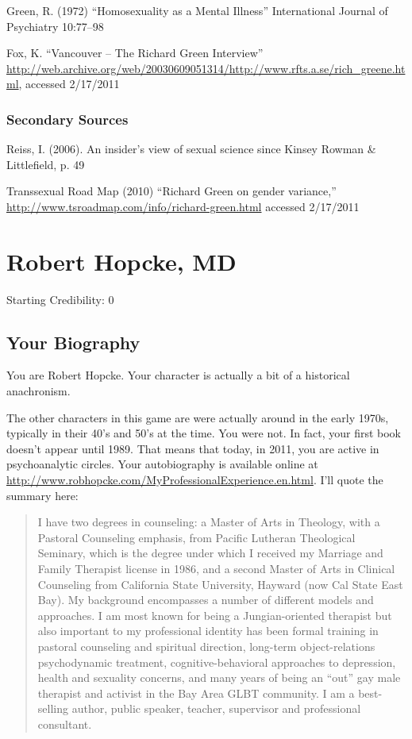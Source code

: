 \begin{refsection}
Green, R. (1972) “Homosexuality as a Mental Illness” International Journal of Psychiatry 10:77--98

Fox, K. “Vancouver – The Richard Green Interview” \url{http://web.archive.org/web/20030609051314/http://www.rfts.a.se/rich_greene.html}, accessed 2\slash 17\slash 2011

\subsection{Secondary Sources}
\label{secondarysources}

Reiss, I. (2006). An insider's view of sexual science since Kinsey Rowman \& Littlefield, p. 49

Transsexual Road Map (2010) “Richard Green on gender variance,” \url{http://www.tsroadmap.com/info/richard-green.html} accessed 2\slash 17\slash 2011

\chapter{Robert Hopcke, MD}
\label{roberthopckemd}

Starting Credibility: 0

\section{Your Biography}
\label{yourbiography}

You are Robert Hopcke. Your character is actually a bit of a historical anachronism. 

The other characters in this game are were actually around in the early 1970s, typically in their 40's and 50's at the time. You were not. In fact, your first book doesn't appear until 1989. That means that today, in 2011, you are active in psychoanalytic circles. Your autobiography is available online at \url{http://www.robhopcke.com/MyProfessionalExperience.en.html}. I'll quote the summary here:

\begin{quote}

I have two degrees in counseling: a Master of Arts in Theology, with a Pastoral Counseling emphasis, from Pacific Lutheran Theological Seminary, which is the degree under which I received my Marriage and Family Therapist license in 1986, and a second Master of Arts in Clinical Counseling from California State University, Hayward (now Cal State East Bay). My background encompasses a number of different models and approaches. I am most known for being a Jungian-oriented therapist but also important to my professional identity has been formal training in pastoral counseling and spiritual direction, long-term object-relations psychodynamic treatment, cognitive-behavioral approaches to depression, health and sexuality concerns, and many years of being an ``out'' gay male therapist and activist in the Bay Area GLBT community. I am a best-selling author, public speaker, teacher, supervisor and professional consultant.
\end{quote}


\end{refsection}

